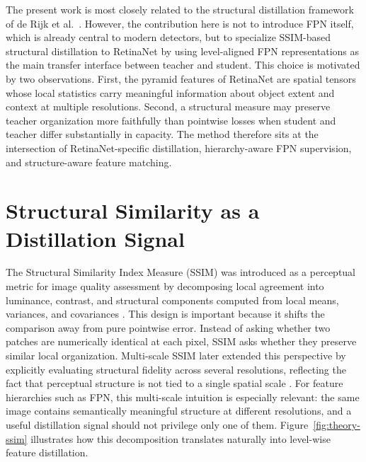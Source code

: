 \DetectionKDFigure

The present work is most closely related to the structural distillation framework of de Rijk et al.\ \cite{derijk2022structural}. However, the contribution here is not to introduce FPN itself, which is already central to modern detectors, but to specialize SSIM-based structural distillation to RetinaNet by using level-aligned FPN representations as the main transfer interface between teacher and student. This choice is motivated by two observations. First, the pyramid features of RetinaNet are spatial tensors whose local statistics carry meaningful information about object extent and context at multiple resolutions. Second, a structural measure may preserve teacher organization more faithfully than pointwise losses when student and teacher differ substantially in capacity. The method therefore sits at the intersection of RetinaNet-specific distillation, hierarchy-aware FPN supervision, and structure-aware feature matching.

\section{Structural Similarity as a Distillation Signal}

The Structural Similarity Index Measure (SSIM) was introduced as a perceptual metric for image quality assessment by decomposing local agreement into luminance, contrast, and structural components computed from local means, variances, and covariances \cite{wang2004ssim}. This design is important because it shifts the comparison away from pure pointwise error. Instead of asking whether two patches are numerically identical at each pixel, SSIM asks whether they preserve similar local organization. Multi-scale SSIM later extended this perspective by explicitly evaluating structural fidelity across several resolutions, reflecting the fact that perceptual structure is not tied to a single spatial scale \cite{wang2003msssim}. For feature hierarchies such as FPN, this multi-scale intuition is especially relevant: the same image contains semantically meaningful structure at different resolutions, and a useful distillation signal should not privilege only one of them. Figure~\ref{fig:theory-ssim} illustrates how this decomposition translates naturally into level-wise feature distillation.

\SSIMDistillationFigure

